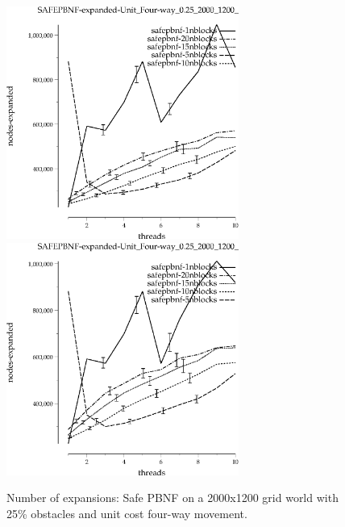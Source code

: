 \documentclass{article}
\begin{document}
\begin{figure}[t]
\begin{center}
\includegraphics[width=3in]{grid_unit_four-way_0.25_2000_1200/SAFEPBNF-expanded-Unit_Four-way_0.25_2000_1200_min=60.eps}
\includegraphics[width=3in]{grid_unit_four-way_0.25_2000_1200/SAFEPBNF-expanded-Unit_Four-way_0.25_2000_1200_min=80.eps}
\caption{Number of expansions: Safe PBNF on a 2000x1200 grid world with 25\%
  obstacles and unit cost four-way movement.}
\end{center}
\end{figure}
\end{document}
